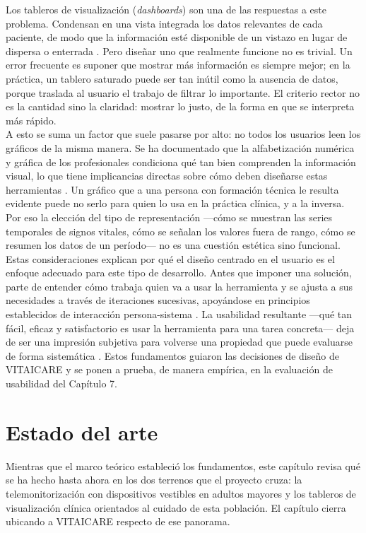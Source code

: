 Los tableros de visualización (\textit{dashboards}) son una de las respuestas a este problema. Condensan en una vista integrada los datos relevantes de cada paciente, de modo que la información esté disponible de un vistazo en lugar de dispersa o enterrada \cite{dowding2015}. Pero diseñar uno que realmente funcione no es trivial. Un error frecuente es suponer que mostrar más información es siempre mejor; en la práctica, un tablero saturado puede ser tan inútil como la ausencia de datos, porque traslada al usuario el trabajo de filtrar lo importante. El criterio rector no es la cantidad sino la claridad: mostrar lo justo, de la forma en que se interpreta más rápido.\\

A esto se suma un factor que suele pasarse por alto: no todos los usuarios leen los gráficos de la misma manera. Se ha documentado que la alfabetización numérica y gráfica de los profesionales condiciona qué tan bien comprenden la información visual, lo que tiene implicancias directas sobre cómo deben diseñarse estas herramientas \cite{dowding2018}. Un gráfico que a una persona con formación técnica le resulta evidente puede no serlo para quien lo usa en la práctica clínica, y a la inversa. Por eso la elección del tipo de representación —cómo se muestran las series temporales de signos vitales, cómo se señalan los valores fuera de rango, cómo se resumen los datos de un período— no es una cuestión estética sino funcional.\\

Estas consideraciones explican por qué el diseño centrado en el usuario es el enfoque adecuado para este tipo de desarrollo. Antes que imponer una solución, parte de entender cómo trabaja quien va a usar la herramienta y se ajusta a sus necesidades a través de iteraciones sucesivas, apoyándose en principios establecidos de interacción persona-sistema \cite{iso9241}. La usabilidad resultante —qué tan fácil, eficaz y satisfactorio es usar la herramienta para una tarea concreta— deja de ser una impresión subjetiva para volverse una propiedad que puede evaluarse de forma sistemática \cite{dowding2019}. Estos fundamentos guiaron las decisiones de diseño de VITAICARE y se ponen a prueba, de manera empírica, en la evaluación de usabilidad del Capítulo 7.\\


\section{Estado del arte}
Mientras que el marco teórico estableció los fundamentos, este capítulo revisa qué se ha hecho hasta ahora en los dos terrenos que el proyecto cruza: la telemonitorización con dispositivos vestibles en adultos mayores y los tableros de visualización clínica orientados al cuidado de esta población. El capítulo cierra ubicando a VITAICARE respecto de ese panorama.\\


